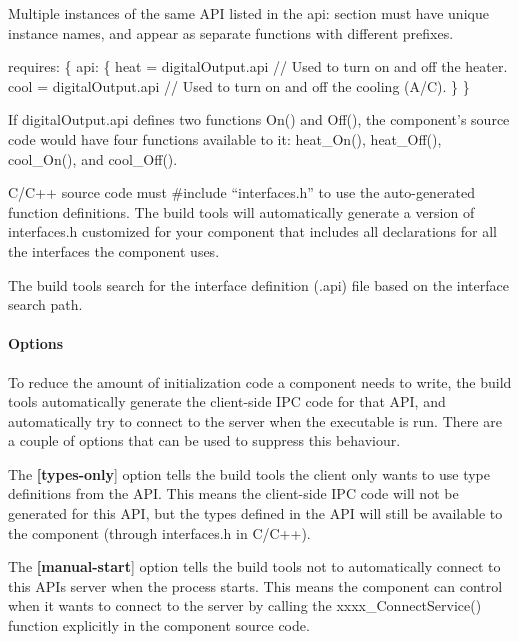 Multiple instances of the same A\+P\+I listed in the {\ttfamily api\+:} section must have unique instance names, and appear as separate functions with different prefixes.


\begin{DoxyCode}
requires:
\{
    api:
    \{
        heat = digitalOutput.api   \textcolor{comment}{// Used to turn on and off the heater.}
        cool = digitalOutput.api   \textcolor{comment}{// Used to turn on and off the cooling (A/C).}
    \}
\}
\end{DoxyCode}


If {\ttfamily  digital\+Output.\+api } defines two functions {\ttfamily On()} {\ttfamily and} Off(), the component’s source code would have four functions available to it\+: {\ttfamily heat\+\_\+\+On()}, {\ttfamily heat\+\_\+\+Off()}, {\ttfamily cool\+\_\+\+On()}, and {\ttfamily cool\+\_\+\+Off()}.

C/\+C++ source code must {\ttfamily  \#include “interfaces.\+h”} to use the auto-\/generated function definitions. The build tools will automatically generate a version of {\ttfamily interfaces.\+h} customized for your component that includes all declarations for all the interfaces the component uses.

The build tools search for the interface definition (.api) file based on the interface search path.\hypertarget{def_files_cdef_defFilesCdef_requiresApiOptions}{}\paragraph{Options}\label{def_files_cdef_defFilesCdef_requiresApiOptions}
To reduce the amount of initialization code a component needs to write, the build tools automatically generate the client-\/side I\+P\+C code for that A\+P\+I, and automatically try to connect to the server when the executable is run. There are a couple of options that can be used to suppress this behaviour.

The {\bfseries {\ttfamily }\mbox{[}types-\/only}\mbox{]} option tells the build tools the client only wants to use type definitions from the A\+P\+I. This means the client-\/side I\+P\+C code will not be generated for this A\+P\+I, but the types defined in the A\+P\+I will still be available to the component (through {\ttfamily interfaces.\+h} in C/\+C++).

The {\bfseries {\ttfamily }\mbox{[}manual-\/start}\mbox{]} option tells the build tools not to automatically connect to this A\+P\+I\textquotesingle{}s server when the process starts. This means the component can control when it wants to connect to the server by calling the {\ttfamily xxxx\+\_\+\+Connect\+Service()} function explicitly in the component source code.



